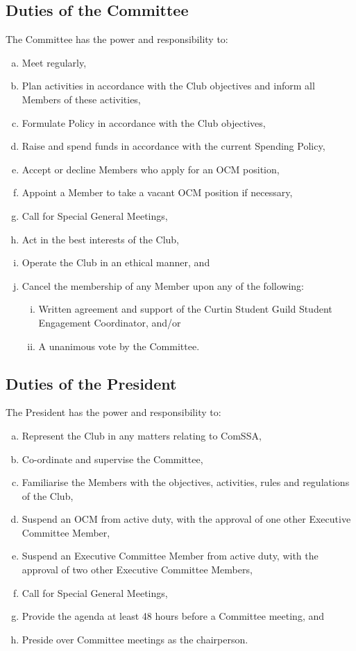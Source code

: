 \documentclass[a4paper,12pt]{article}
\begin{document}
\subsection{Duties of the Committee}

The Committee has the power and responsibility to:

\begin{enumerate}[a)]
	\item Meet regularly,
	\item Plan activities in accordance with the Club objectives and inform all Members of these activities,
	\item Formulate Policy in accordance with the Club objectives,
	\item Raise and spend funds in accordance with the current Spending Policy,
	\item Accept or decline Members who apply for an OCM position,
	\item Appoint a Member to take a vacant OCM position if necessary,
	\item Call for Special General Meetings,
	\item Act in the best interests of the Club,
	\item Operate the Club in an ethical manner, and
	\item Cancel the membership of any Member upon any of the following:
	\begin{enumerate}[i)]
		\item Written agreement and support of the Curtin Student Guild Student Engagement Coordinator, and/or
		\item A unanimous vote by the Committee.
	\end{enumerate}
\end{enumerate}

\subsection{Duties of the President}

The President has the power and responsibility to:

\begin{enumerate}[a)]
	\item Represent the Club in any matters relating to ComSSA,
	\item Co-ordinate and supervise the Committee,
	\item Familiarise the Members with the objectives, activities, rules and regulations of the Club,
	\item Suspend an OCM from active duty, with the approval of one other Executive Committee Member,
	\item Suspend an Executive Committee Member from active duty, with the approval of two other Executive Committee Members,
	\item Call for Special General Meetings,
	\item Provide the agenda at least 48 hours before a Committee meeting, and
	\item Preside over Committee meetings as the chairperson.
\end{enumerate}
\end{document}
